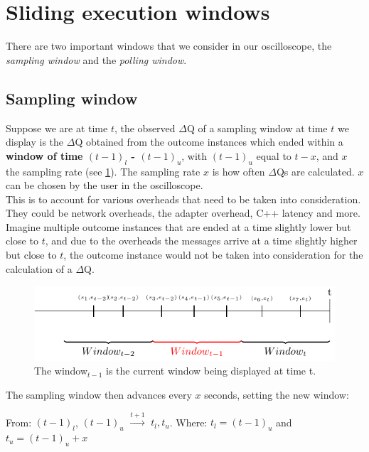 \section{Sliding execution windows}

    There are two important windows that we consider in our oscilloscope, the \textit{sampling window} and the \textit{polling window}.

    \subsection{Sampling window}
    Suppose we are at time $t$, the observed $\Delta$Q of a sampling window at time $t$ we display is the $\Delta$Q obtained from the outcome instances which ended within a \textbf{window of time $(t-1)_{l}$ - $(t-1)_u$}, with $(t-1)_u$ equal to $t - x$, and $x$ the sampling rate (see \cref{fig:sampl_wi}). The sampling rate $x$ is how often $\Delta$Qs are calculated. $x$ can be chosen by the user in the oscilloscope.\\
    This is to account for various overheads that need to be taken into consideration. They could be network overheads, the adapter overhead, C++ latency and more. Imagine multiple outcome instances that are ended at a time slightly lower but close to $t$, and due to the overheads the messages arrive at a time slightly higher but close to $t$, the outcome instance would not be taken into consideration for the calculation of a $\Delta$Q.
    
    \begin{figure}[H]
        \begin{center}
            \includegraphics[scale = 0.8]{tikz/window.pdf}
        \end{center}
        \caption{The window$_{t-1}$ is the current window being displayed at time t.}
        \label{fig:sampl_wi}
    \end{figure}
    
    The sampling window then advances every $x$ seconds, setting the new window: 
    \begin{center}
        From: $(t-1)_l$, $(t-1)_u$ $\xrightarrow{t + 1}$ $t_l, t_u$. Where: $t_l = (t-1)_u$ and $t_u = (t-1)_u + x$ 
    \end{center}
    
